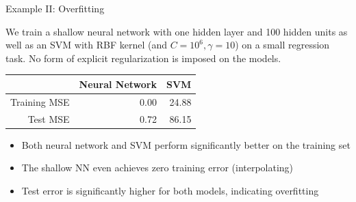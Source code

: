 \documentclass[11pt,compress,t,notes=noshow, xcolor=table]{beamer}
\begin{document}
\begin{vbframe}{Example II: Overfitting}

We train a shallow neural network with one hidden layer and 100 hidden units as well as an SVM with RBF kernel (and $C=10^6, \gamma=10$) on a small regression task. No form of explicit regularization is imposed on the models. %
\vspace{0.2cm}
\begin{table}[ht]
\centering
\begin{tabular}{rrr}
  \hline
 & Neural Network & SVM \\ 
  \hline
Training MSE & 0.00 & 24.88 \\ 
  Test MSE & 0.72 & 86.15 \\ 
   \hline
\end{tabular}
\end{table}
\vspace{0.3cm}
\begin{itemize}
    \item Both neural network and SVM perform significantly better on the training set
    \item The shallow NN even achieves zero training error (interpolating)
    \item Test error is significantly higher for both models, indicating overfitting
\end{itemize}

\end{vbframe}
\end{document}
